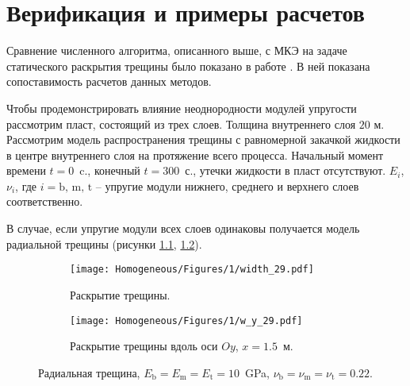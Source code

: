 \chapter{Верификация и примеры расчетов}
\label{ch:verification}

Сравнение численного алгоритма, описанного выше, с МКЭ на задаче статического раскрытия трещины было показано в работе \cite{Peirce2001UniformAA}. В ней показана сопоставимость расчетов данных методов.

Чтобы продемонстрировать влияние неоднородности модулей упругости рассмотрим пласт, состоящий из трех слоев. Толщина внутреннего слоя $20$ м. Рассмотрим модель распространения трещины с равномерной закачкой жидкости в центре внутреннего слоя на протяжение всего процесса. Начальный момент времени $t = 0$~c., конечный $t = 300$~с., утечки жидкости в пласт отсутствуют. $E_i$, $\nu_i$, где $i=\text{b, m, t}$ -- упругие модули нижнего, среднего и верхнего слоев соответственно. 

В случае, если упругие модули всех слоев одинаковы получается модель радиальной трещины (рисунки \ref{fig:homogeneous-planar}, \ref{fig:homogeneous-slice}).
\begin{figure}[htbp]
    \centering
    \begin{subfigure}[t]{0.4\textwidth}
        \centering
        \caption{Раскрытие трещины.}
        \label{fig:homogeneous-planar}
        \texttt{[image: Homogeneous/Figures/1/width\_29.pdf]}
    \end{subfigure}
    \hfill 
    \begin{subfigure}[t]{0.55\textwidth}
        \centering
        \caption{Раскрытие трещины вдоль оси $Oy$, $x=1.5$~м.}
        \label{fig:homogeneous-slice}
        \texttt{[image: Homogeneous/Figures/1/w\_y\_29.pdf]}
    \end{subfigure}
    \caption{Радиальная трещина, $E_\text{b} = E_\text{m} = E_\text{t} = 10$~GPa, $\nu_\text{b} = \nu_\text{m} = \nu_\text{t} = 0.22$.}
    \label{fig:homogeneous}
\end{figure}

